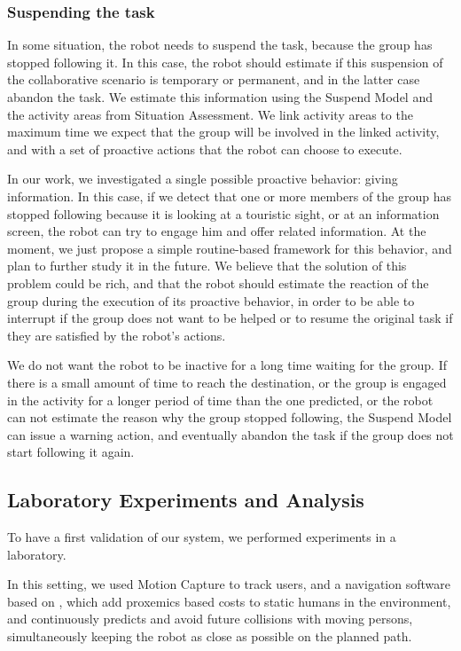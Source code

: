 \subsubsection{Suspending the task}
In some situation, the robot needs to suspend the task, because the group has stopped following it. In this case, the robot should estimate if this suspension of the collaborative scenario is temporary or permanent, and in the latter case abandon the task. We estimate this information using the Suspend Model and the activity areas from Situation Assessment. We link activity areas to the maximum time we expect that the group will be involved in the linked activity, and with a set of proactive actions that the robot can choose to execute.

In our work, we investigated a single possible proactive behavior: giving information. In this case, if we detect that one or more  members
of the group has stopped following because it is looking at a touristic sight, or at an information screen, the robot can try to engage him and offer related information. At the moment, we just propose a simple routine-based framework for this behavior, and plan to further study it in the future. We believe that the solution of this problem could be rich, and that the robot should estimate the reaction of the group during the execution of its proactive behavior, in order to be able to interrupt if the group does not want to be helped or to resume the original task if they are satisfied by the robot's actions.

We do not want the robot to be inactive for a long time  waiting for the group. If there is a small amount of time to reach the destination, or the group is engaged in the activity for a longer period of time than the one predicted, or the robot can not estimate the reason why the group stopped following, the Suspend Model can issue a warning action, and eventually abandon the task if the group does not start following it again.

\subsection{Laboratory Experiments and Analysis}
To have a first validation of our system, we performed experiments in a laboratory.

In this setting, we used Motion Capture to track users, and a navigation software based on \cite{sisbotTRO2007,kruse12crossing}, which add proxemics based costs to static humans in the environment, and continuously predicts and avoid future collisions with moving persons,  simultaneously keeping the robot as close as possible on the planned path.

